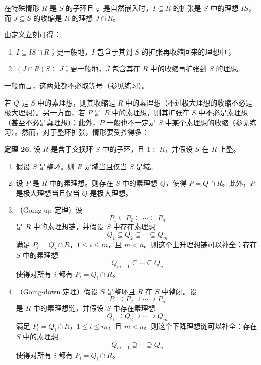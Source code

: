 在特殊情形 $R$ 是 $S$ 的子环且 $\varphi$ 是自然嵌入时，$I\subseteq R$ 的扩张是 $S$ 中的理想 $IS$，而 $J\subseteq S$ 的收缩是 $R$ 的理想 $J\cap R$。

由定义立刻可得：
\begin{enumerate}[label=(\arabic*)]
	\item $I\subseteq IS\cap R$；更一般地，$I$ 包含于其到 $S$ 的扩张再收缩回来的理想中；
	\item $(J\cap R)S\subseteq J$；更一般地，$J$ 包含其在 $R$ 中的收缩再扩张到 $S$ 的理想。
\end{enumerate}
一般而言，这两处都不必取等号（参见练习）。

若 $Q$ 是 $S$ 中的素理想，则其收缩是 $R$ 中的素理想（不过极大理想的收缩不必是极大理想）。另一方面，若 $P$ 是 $R$ 中的素理想，则其扩张在 $S$ 中不必是素理想（甚至不必是真理想）；此外，$P$ 一般也不一定是 $S$ 中某个素理想的收缩（参见练习）。然而，对于整环扩张，情形要受控得多：

\noindent\textbf{定理 26.} 设 $R$ 是含于交换环 $S$ 中的子环，且 $1\in R$，并假设 $S$ 在 $R$ 上整。
\begin{enumerate}[label=(\arabic*)]
	\item 假设 $S$ 是整环。则 $R$ 是域当且仅当 $S$ 是域。
	\item 设 $P$ 是 $R$ 中的素理想。则存在 $S$ 中的素理想 $Q$，使得 $P=Q\cap R$。此外，$P$ 是极大理想当且仅当 $Q$ 是极大理想。
	\item （Going-up 定理）设
	\[
	P_1\subseteq P_2\subseteq\cdots\subseteq P_n
	\]
	是 $R$ 中的素理想链，并假设 $S$ 中存在素理想
	\[
	Q_1\subseteq Q_2\subseteq\cdots\subseteq Q_m
	\]
	满足 $P_i=Q_i\cap R$，$1\le i\le m$，且 $m<n$。则这个上升理想链可以补全：存在 $S$ 中的素理想
	\[
	Q_{m+1}\subseteq\cdots\subseteq Q_n
	\]
	使得对所有 $i$ 都有 $P_i=Q_i\cap R$。
	\item （Going-down 定理）假设 $S$ 是整环且 $R$ 在 $S$ 中整闭。设
	\[
	P_1\supseteq P_2\supseteq\cdots\supseteq P_n
	\]
	是 $R$ 中的素理想链，并假设 $S$ 中存在素理想
	\[
	Q_1\supseteq Q_2\supseteq\cdots\supseteq Q_m
	\]
	满足 $P_i=Q_i\cap R$，$1\le i\le m$，且 $m<n$。则这个下降理想链可以补全：存在 $S$ 中的素理想
	\[
	Q_{m+1}\supseteq\cdots\supseteq Q_n
	\]
	使得对所有 $i$ 都有 $P_i=Q_i\cap R$。
\end{enumerate}

